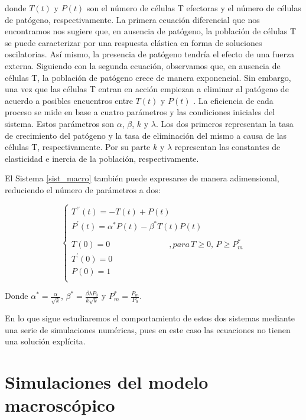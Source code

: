 donde $T(t)$ y $P(t)$ son el número de células T efectoras y el número de células de patógeno, respectivamente. La primera ecuación diferencial que nos encontramos nos sugiere que, en ausencia de patógeno, la población de células T se puede caracterizar por una respuesta elástica en forma de soluciones oscilatorias. Así mismo, la presencia de patógeno tendría el efecto de una fuerza externa. Siguiendo con la segunda ecuación, observamos que, en ausencia de células T, la población de patógeno crece de manera exponencial. Sin embargo, una vez que las células T entran en acción empiezan a eliminar al patógeno de acuerdo a posibles encuentros entre $T(t)$ y $P(t)$ \citep{arias2016emergent}. La eficiencia de cada proceso se mide en base a cuatro parámetros y las condiciones iniciales del sistema. Estos parámetros son $\alpha$, $\beta$, $k$ y $\lambda$. Los dos primeros representan la tasa de crecimiento del patógeno y la tasa de eliminación del mismo a causa de las células T, respectivamente. Por su parte $k$ y $\lambda$ representan las constantes de elasticidad e inercia de la población, respectivamente. 

El Sistema \ref{sist_macro} también puede expresarse de manera adimensional, reduciendo el número de parámetros a dos: 

\begin{equation}
	\label{sist_macro_nod}
	\left\{ \begin{array}{l}
	{T^{\prime\prime}}(t) = -T(t) + P(t) \\
	{P^{\prime}}(t) = \alpha^{*} P(t) - \beta^{*} T(t)P(t) \\
	\\
	T(0)=0 \hspace{3cm} ,para\, T \geq 0,\, P \geq P_m^{*} \\
	T^{\prime}(0)=0  \\
	P(0)=1 \\ 
	\end{array}
	\right.
\end{equation}

Donde $\alpha^{*} = \frac{\alpha}{\sqrt k}$, $\beta^{*} = \frac{\beta \lambda P_0}{k \sqrt k}$ y $P_{m}^{*} = \frac{P_m}{P_0}$.

En lo que sigue estudiaremos el comportamiento de estos dos sistemas mediante una serie de simulaciones numéricas, pues en este caso las ecuaciones no tienen una solución explícita.

\section{Simulaciones del modelo macroscópico}
\label{sec:simu_macro}

